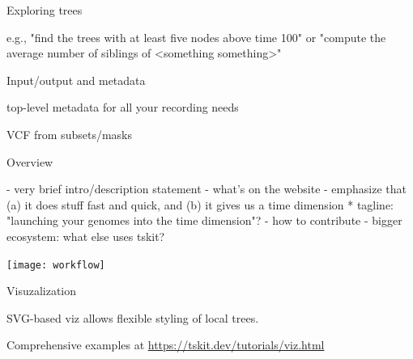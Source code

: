 \documentclass[landscape,a0paper,fontscale=0.292]{baposter}
\begin{document}
\begin{poster}
\begin{posterbox}[name=exploring,column=0,span=1]{Exploring trees}

e.g., "find the trees with at least five nodes above time 100" or "compute the average number of siblings of <something something>"

\end{posterbox}

\begin{posterbox}[name=inout,column=0,below=exploring,span=1]{Input/output and metadata}

top-level metadata for all your recording needs

VCF from subsets/masks

\end{posterbox}


\begin{posterbox}[name=overview,column=1,row=0,span=2]{Overview}

- very brief intro/description statement
- what's on the website
- emphasize that (a) it does stuff fast and quick, and (b) it gives us a time dimension
    * tagline: "launching your genomes into the time dimension"?
- how to contribute
- bigger ecosystem: what else uses tskit?

\texttt{[image: workflow]}


\end{posterbox}

\begin{posterbox}[name=viz,column=1,row=0,span=2,below=overview]{Visuzalization}

SVG-based viz allows flexible styling of local trees.

Comprehensive examples at \url{https://tskit.dev/tutorials/viz.html}



\end{posterbox}
\end{poster}
\end{document}
